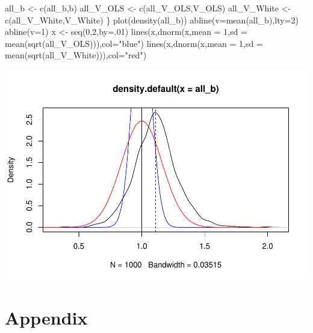 \documentclass[
]{book}
\newenvironment{Shaded}{\begin{snugshade}}{\end{snugshade}}
\newcommand{\AttributeTok}[1]{\textcolor[rgb]{0.77,0.63,0.00}{#1}}
\newcommand{\DecValTok}[1]{\textcolor[rgb]{0.00,0.00,0.81}{#1}}
\newcommand{\FunctionTok}[1]{\textcolor[rgb]{0.00,0.00,0.00}{#1}}
\newcommand{\NormalTok}[1]{#1}
\newcommand{\OtherTok}[1]{\textcolor[rgb]{0.56,0.35,0.01}{#1}}
\newcommand{\StringTok}[1]{\textcolor[rgb]{0.31,0.60,0.02}{#1}}
\theoremstyle{definition}
\theoremstyle{definition}
\theoremstyle{definition}
\theoremstyle{definition}
\theoremstyle{remark}
\begin{document}
\begin{Shaded}
\begin{Highlighting}[]
\NormalTok{  all\_b       }\OtherTok{\textless{}{-}} \FunctionTok{c}\NormalTok{(all\_b,b)}
\NormalTok{  all\_V\_OLS   }\OtherTok{\textless{}{-}} \FunctionTok{c}\NormalTok{(all\_V\_OLS,V\_OLS)}
\NormalTok{  all\_V\_White }\OtherTok{\textless{}{-}} \FunctionTok{c}\NormalTok{(all\_V\_White,V\_White)}
\NormalTok{\}}
\FunctionTok{plot}\NormalTok{(}\FunctionTok{density}\NormalTok{(all\_b))}
\FunctionTok{abline}\NormalTok{(}\AttributeTok{v=}\FunctionTok{mean}\NormalTok{(all\_b),}\AttributeTok{lty=}\DecValTok{2}\NormalTok{)}
\FunctionTok{abline}\NormalTok{(}\AttributeTok{v=}\DecValTok{1}\NormalTok{)}
\NormalTok{x }\OtherTok{\textless{}{-}} \FunctionTok{seq}\NormalTok{(}\DecValTok{0}\NormalTok{,}\DecValTok{2}\NormalTok{,}\AttributeTok{by=}\NormalTok{.}\DecValTok{01}\NormalTok{)}
\FunctionTok{lines}\NormalTok{(x,}\FunctionTok{dnorm}\NormalTok{(x,}\AttributeTok{mean =} \DecValTok{1}\NormalTok{,}\AttributeTok{sd =} \FunctionTok{mean}\NormalTok{(}\FunctionTok{sqrt}\NormalTok{(all\_V\_OLS))),}\AttributeTok{col=}\StringTok{"blue"}\NormalTok{)}
\FunctionTok{lines}\NormalTok{(x,}\FunctionTok{dnorm}\NormalTok{(x,}\AttributeTok{mean =} \DecValTok{1}\NormalTok{,}\AttributeTok{sd =} \FunctionTok{mean}\NormalTok{(}\FunctionTok{sqrt}\NormalTok{(all\_V\_White))),}\AttributeTok{col=}\StringTok{"red"}\NormalTok{)}
\end{Highlighting}
\end{Shaded}

\includegraphics{bookdown-demo_files/figure-latex/simulHeterosk2-1.pdf}

\hypertarget{appendix}{%
\chapter{Appendix}\label{appendix}}
\end{document}
